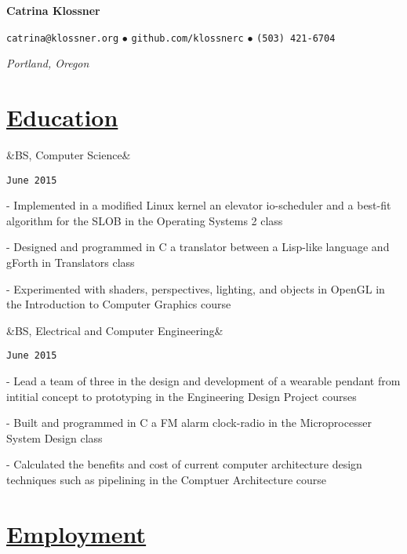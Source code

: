 \documentclass[11pt]{article}
\newcommand{\heading}[1]{
    \section*{\uline{\hfill #1}}
}
\newcommand{\squish}{
    \setlength{\itemsep}{0.5pt}
    \setlength{\parskip}{0pt}
    \setlength{\parsep}{0.5pt}
}
\newcommand{\when}[1]{
    \hfill \texttt{#1}
}
\newcommand{\experience}[3]{
    \ifx&#2&
        \item[{#1}]
    \else
        \item[{#1}, \emph{#2}]
    \fi
    \when{#3}
}
\newcommand{\contact}[4]{
    \centerline{
        \large       
        \texttt{#1}
        $\bullet$
        \texttt{#2}
        $\bullet$
        \texttt{#3}
    }
    \centerline{
        \emph{#4}
    }
}
\newcommand{\skill}[2]{
    \textbf{#1} \hfill #2
}
\newcommand{\CPP}{
    C\hspace{-.05em}\raisebox{.4ex}{\tiny\bf +}\hspace{-.10em}\raisebox{.4ex}{\tiny\bf +}
}
\begin{document}
\centerline{{\Huge \bf Catrina Klossner}}
\bigskip

\contact{catrina@klossner.org}
        {github.com/klossnerc}
        {(503) 421-6704}
        {Portland, Oregon}

%
%
%
%

\heading{Education}%

\begin{description}
\squish   
\experience{Oregon State University}
           {BS, Computer Science}
           {June 2015}

	- Implemented in a modified Linux kernel an elevator io-scheduler and a best-fit algorithm for the SLOB in the Operating Systems 2 class

	- Designed and programmed in C a translator between a Lisp-like language and gForth in Translators class

	- Experimented with shaders, perspectives, lighting, and objects in OpenGL in the Introduction to Computer Graphics course


\experience{Oregon State University}
           {BS, Electrical and Computer Engineering}
           {June 2015}

	- Lead a team of three in the design and development of a wearable pendant from intitial concept to prototyping in the Engineering Design Project courses

	- Built and programmed in C a FM alarm clock-radio in the Microprocesser System Design class

	- Calculated the benefits and cost of current computer architecture design techniques such as pipelining in the Comptuer Architecture course


\end{description}

\heading{Employment}%
\end{document}

